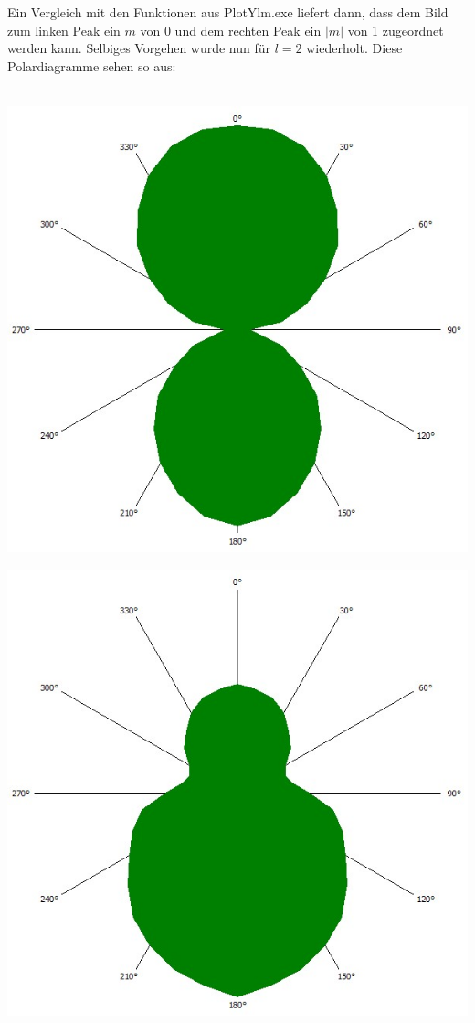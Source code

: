 \documentclass[german,  %
parskip=full,  %
]{scrartcl}
\begin{document}
\\\\
Ein Vergleich mit den Funktionen aus PlotYlm.exe liefert dann, dass dem Bild zum linken Peak ein $m$ von 0 und dem rechten Peak ein $|m|$ von 1 zugeordnet werden kann. 
\newline Selbiges Vorgehen wurde nun für $l=2$ wiederholt. Diese Polardiagramme sehen so aus:
\\\\
\begin{minipage}{0.48 \textwidth} \centering
\includegraphics[scale=0.3]{445_l2_linker_Peak.jpg}
\end{minipage}
\begin{minipage}{0.48 \textwidth} \centering
\includegraphics[scale=0.3]{445_l2_mittlerer_Peak.jpg}
\end{minipage}
\end{document}
